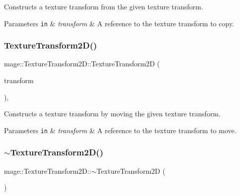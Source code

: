 Constructs a texture transform from the given texture transform.


\begin{DoxyParams}[1]{Parameters}
\mbox{\tt in}  & {\em transform} & A reference to the texture transform to copy. \\
\hline
\end{DoxyParams}
\mbox{\label{classmage_1_1_texture_transform2_d_adf3d2c8e2966508c933c2bb323880ba7}} 
\subsubsection{\texorpdfstring{Texture\+Transform2\+D()}{TextureTransform2D()}\hspace{0.1cm}{\footnotesize\ttfamily [4/4]}}
{\footnotesize\ttfamily mage\+::\+Texture\+Transform2\+D\+::\+Texture\+Transform2D (\begin{DoxyParamCaption}\item[{\mbox{\hyperlink{classmage_1_1_texture_transform2_d}{Texture\+Transform2D}} \&\&}]{transform }\end{DoxyParamCaption})\hspace{0.3cm}{\ttfamily [default]}, {\ttfamily [noexcept]}}

Constructs a texture transform by moving the given texture transform.


\begin{DoxyParams}[1]{Parameters}
\mbox{\tt in}  & {\em transform} & A reference to the texture transform to move. \\
\hline
\end{DoxyParams}
\mbox{\label{classmage_1_1_texture_transform2_d_a4df184f3e160d08d0f5a7dd4c58f2bec}} 
\subsubsection{\texorpdfstring{$\sim$\+Texture\+Transform2\+D()}{~TextureTransform2D()}}
{\footnotesize\ttfamily mage\+::\+Texture\+Transform2\+D\+::$\sim$\+Texture\+Transform2D (\begin{DoxyParamCaption}{ }\end{DoxyParamCaption})\hspace{0.3cm}{\ttfamily [default]}}

